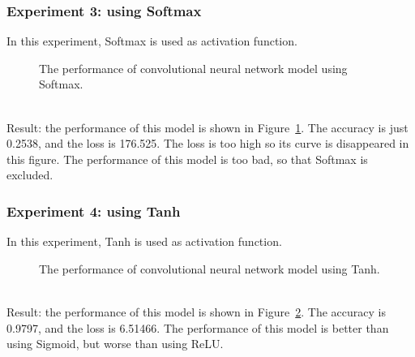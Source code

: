 \documentclass[]{UCD_CS_FYP_Report}
\begin{document}
\subsubsection{Experiment 3: using Softmax}
In this experiment, Softmax is used as activation function.
\begin{figure}[h]
\centering
\fboxsep 2mm
\caption{\label{fig:MNIST_CNN_S1E3} The performance of convolutional neural network model using Softmax.}
\end{figure}
\\Result: the performance of this model is shown in Figure~\ref{fig:MNIST_CNN_S1E3}. The accuracy is just 0.2538, and the loss is 176.525. The loss is too high so its curve is disappeared in this figure. The performance of this model is too bad, so that Softmax is excluded.
%
\subsubsection{Experiment 4: using Tanh}
In this experiment, Tanh is used as activation function.
\begin{figure}[h]
\centering
\fboxsep 2mm
\caption{\label{fig:MNIST_CNN_S1E4} The performance of convolutional neural network model using Tanh.}
\end{figure}
\\Result: the performance of this model is shown in Figure~\ref{fig:MNIST_CNN_S1E4}. The accuracy is 0.9797, and the loss is 6.51466. The performance of this model is better than using Sigmoid, but worse than using ReLU.
%
\end{document}
